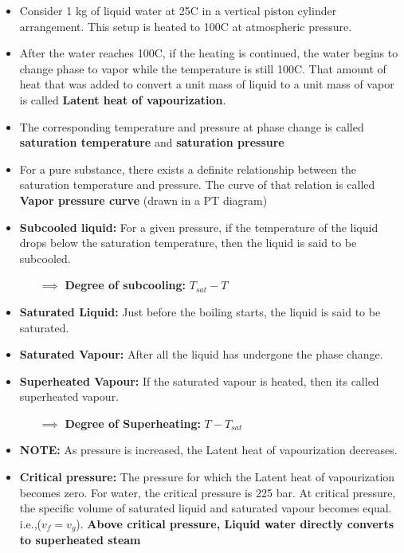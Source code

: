 \documentclass[8pt]{article}
\begin{document}
	\begin{itemize}
		\item Consider 1 kg of liquid water at 25\textdegree C in a vertical piston cylinder arrangement. This setup is heated to 100\textdegree C at atmospheric pressure. 
		\item After the water reaches 100\textdegree C, if the heating is continued, the water begins to change phase to vapor while the temperature is still 100\textdegree C. That amount of heat that was added to convert a unit mass of liquid to a unit mass of vapor is called \textbf{Latent heat of vapourization}.
		\item The corresponding temperature and pressure at phase change is called \textbf{saturation temperature} and \textbf{saturation pressure}
		\item For a pure substance, there exists a definite relationship between the saturation temperature and pressure. The curve of that relation is called \textbf{Vapor pressure curve} (drawn in a PT diagram)
		\item \textbf{Subcooled liquid: }For a given pressure, if the temperature of the liquid drops below the saturation temperature, then the liquid is said to be subcooled. 
		\begin{itemize}
			\item[$\implies$]\textbf{Degree of subcooling: } $T_{sat} - T$	
		\end{itemize}				
		\item \textbf{Saturated Liquid: }Just before the boiling starts, the liquid is said to be saturated.
		\item \textbf{Saturated Vapour: }After all the liquid has undergone the phase change. 
		\item \textbf{Superheated Vapour: }If the saturated vapour is heated, then its called superheated vapour. 
		\begin{itemize}
			\item[$\implies$]\textbf{Degree of Superheating: } $T-T_{sat}$	
		\end{itemize}
		\item \textbf{NOTE: } As pressure is increased, the Latent heat of vapourization decreases.
		\item \textbf{Critical pressure: } The pressure for which the Latent heat of vapourization becomes zero. For water, the critical pressure is 225 bar. At critical pressure, the specific volume of saturated liquid and saturated vapour becomes equal. i.e.,($v_f=v_g$). \textbf{Above critical pressure, Liquid water directly converts to superheated steam}

\end{itemize}
\end{document}
